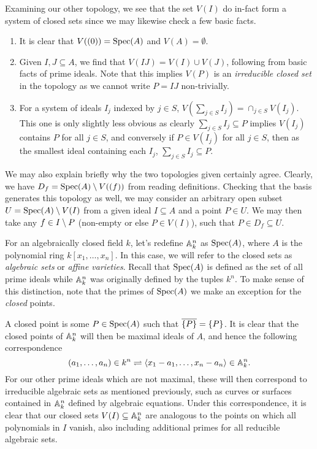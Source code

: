 \documentclass[12pt]{article}
\begin{document}
Examining our other topology, we see that the set $V(I)$ do in-fact form a system of closed sets since we may likewise check a few basic facts.
\begin{enumerate}
    \item It is clear that $V((0)) = {\rm Spec}(A)$ and $V(A) = \emptyset$.
    \item Given $I, J \subseteq A$, we find that $V(IJ) = V(I) \cup V(J)$, following from basic facts of prime ideals.
    Note that this implies $V(P)$ is an \textit{irreducible closed set} in the topology as we cannot write $P = IJ$ non-trivially.
    \item For a system of ideals $I_j$ indexed by $j \in S$, $V( \sum_{j \in S} I_j ) = \cap_{j \in S} V(I_j).$
    This one is only slightly less obvious as clearly $\sum_{j \in S} I_j \subseteq P$ implies $V(I_j)$ contains $P$ for all $j \in S$,
    and conversely if $P \in V(I_j)$ for all $j \in S$, then as the smallest ideal containing each $I_j$, $\sum_{j \in S} I_j \subseteq P$.
\end{enumerate}

We may also explain briefly why the two topologies given certainly agree.
Clearly, we have $D_f = {\rm Spec}(A) \setminus V((f))$ from reading definitions.
Checking that the basis generates this topology as well, 
we may consider an arbitrary open subset $U = {\rm Spec}(A) \setminus V(I)$ from a given ideal $I \subseteq A$ and a point $P \in U$. 
We may then take any $f \in I \setminus P$ (non-empty or else $P \in V(I)$), such that $P \in D_f \subseteq U$.

For an algebraically closed field $k$, let's redefine $\mathbb{A}_k^n$ as ${\rm Spec}(A)$, where $A$ is the polynomial ring $k[x_1, \ldots, x_n].$
In this case, we will refer to the closed sets as \textit{algebraic sets} or \textit{affine varieties}.
Recall that ${\rm Spec}(A)$ is defined as the set of all prime ideals while $\mathbb{A}_k^n$ was originally defined by the tuples $k^n$.
To make sense of this distinction, note that the primes of ${\rm Spec}(A)$ we make an exception for the \textit{closed} points.

A closed point is some $P \in {\rm Spec}(A)$ such that $\overline{\{P\}} = \{P\}$.
It is clear that the closed points of $\mathbb{A}_k^n$ will then be maximal ideals of $A$, and hence the following correspondence
\[
    (a_1, \ldots, a_n) \in k^n \rightleftharpoons \langle x_1 - a_1, \ldots, x_n - a_n \rangle \in \mathbb{A}_k^n.
\]
For our other prime ideals which are not maximal, these will then correspond to irreducible algebraic sets as mentioned previously, 
such as curves or surfaces contained in $\mathbb{A}_k^n$ defined by algebraic equations.
Under this correspondence, it is clear that our closed sets $V(I) \subseteq \mathbb{A}^n_k$ are analogous to the points on which all polynomials in $I$ vanish,
also including additional primes for all reducible algebraic sets.
\end{document}
